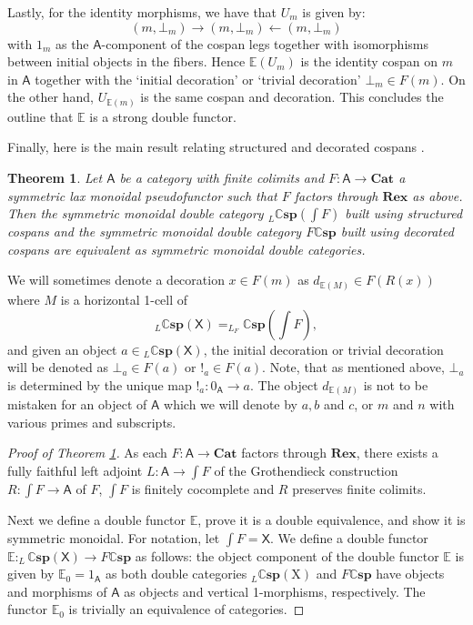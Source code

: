 \documentclass[oneside,final]{ucr}
\newtheorem{theorem}{Theorem}[section]
\theoremstyle{definition}
\begin{document}
{Lastly, for the identity morphisms, we have that $U_m$ is given by: $$(m,\bot_m) \xrightarrow{} (m,\bot_m) \xleftarrow{} (m,\bot_m)$$ with $1_m$ as the $\mathsf{A}$-component of the cospan legs together with isomorphisms between initial objects in the fibers. Hence $\mathbb{E}(U_m)$ is the identity cospan on $m$ in $\mathsf{A}$ together with the `initial decoration' or `trivial decoration' $\bot_m \in F(m)$. On the other hand, $U_{\mathbb{E}(m)}$ is the same cospan and decoration. This concludes the outline that $\mathbb{E}$ is a strong double functor.

Finally, here is the main result relating structured and decorated cospans \cite{BCV}. 

\begin{theorem}\label{Equiv}
Let $\mathsf{A}$ be a category with finite colimits and $F \colon \mathsf{A} \to \mathbf{Cat}$ a symmetric lax monoidal pseudofunctor such that $F$ factors through $\mathbf{Rex}$ as above. Then the symmetric monoidal double category $_L \mathbb{C}\mathbf{sp}(\int{F})$ built using structured cospans and the symmetric monoidal double category $F\mathbb{C}\mathbf{sp}$ built using decorated cospans are equivalent as symmetric monoidal double categories.
\end{theorem}

We will sometimes denote a decoration $x \in F(m)$ as $d_{\mathbb{E}(M)} \in F(R(x))$ where $M$ is a horizontal 1-cell of $$_L \mathbb{C} \mathbf{sp}(\mathsf{X}) = _{L_F} \mathbb{C} \mathbf{sp}(\int F),$$ and given an object $a \in { _L \mathbb{C}\mathbf{sp}(\mathsf{X})}$, the initial decoration or trivial decoration will be denoted as $\bot_a \in F(a)$ or $!_a \in F(a)$. Note, that as mentioned above, $\bot_a$ is determined by the unique map $!_a \colon 0_\mathsf{A} \to a$. The object $d_{\mathbb{E}(M)}$ is not to be mistaken for an object of $\mathsf{A}$ which we will denote by $a,b$ and $c$, or $m$ and $n$ with various primes and subscripts.

\begin{proof}[Proof of Theorem \ref{Equiv}]
As each $F \colon \mathsf{A} \to \mathbf{Cat}$ factors through $\mathbf{Rex}$, there exists a fully faithful left adjoint $L \colon \mathsf{A} \to \int{F}$ of the Grothendieck construction $R \colon \int{F} \to \mathsf{A}$ of $F$, $\int{F}$ is finitely cocomplete and $R$ preserves finite colimits. 

Next we define a double functor $\mathbb{E}$, prove it is a double equivalence, and show it is symmetric monoidal. For notation, let $\int F = \mathsf{X}$. We define a double functor $\mathbb{E} \colon _L \mathbb{C}\mathbf{sp}(\mathsf{X}) \to F\mathbb{C}\mathbf{sp}$ as follows: the object component of the double functor $\mathbb{E}$ is given by $\mathbb{E}_0 = 1_{\mathsf{A}}$ as both double categories $_L \mathbb{C}\mathbf{sp}(\mathrm{X})$ and $F\mathbb{C}\mathbf{sp}$ have objects and morphisms of $\mathsf{A}$ as objects and vertical 1-morphisms, respectively. The functor $\mathbb{E}_0$ is trivially an equivalence of categories.


\end{proof}}
\end{document}
